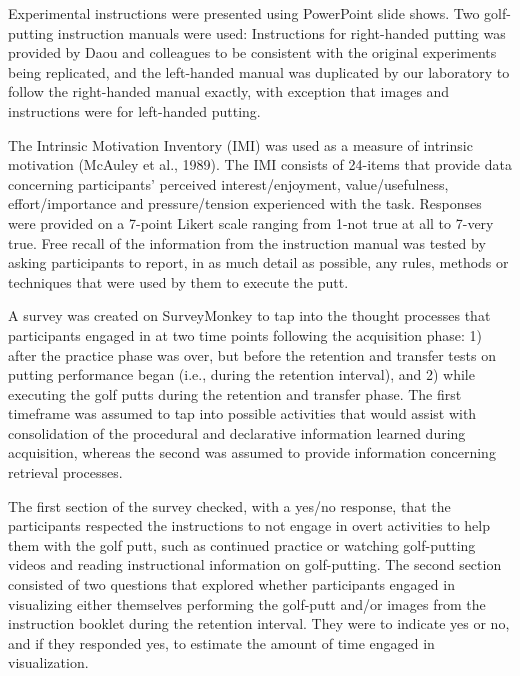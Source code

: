 \documentclass[
  english,
  man,floatsintext]{apa7}
\begin{document}
Experimental instructions were presented using PowerPoint slide shows. Two golf-putting instruction manuals were used: Instructions for right-handed putting was provided by Daou and colleagues to be consistent with the original experiments being replicated, and the left-handed manual was duplicated by our laboratory to follow the right-handed manual exactly, with exception that images and instructions were for left-handed putting.

The Intrinsic Motivation Inventory (IMI) was used as a measure of intrinsic motivation (McAuley et al., 1989). The IMI consists of 24-items that provide data concerning participants' perceived interest/enjoyment, value/usefulness, effort/importance and pressure/tension experienced with the task. Responses were provided on a 7-point Likert scale ranging from 1-not true at all to 7-very true. Free recall of the information from the instruction manual was tested by asking participants to report, in as much detail as possible, any rules, methods or techniques that were used by them to execute the putt.

A survey was created on SurveyMonkey to tap into the thought processes that participants engaged in at two time points following the acquisition phase: 1) after the practice phase was over, but before the retention and transfer tests on putting performance began (i.e., during the retention interval), and 2) while executing the golf putts during the retention and transfer phase. The first timeframe was assumed to tap into possible activities that would assist with consolidation of the procedural and declarative information learned during acquisition, whereas the second was assumed to provide information concerning retrieval processes.

The first section of the survey checked, with a yes/no response, that the participants respected the instructions to not engage in overt activities to help them with the golf putt, such as continued practice or watching golf-putting videos and reading instructional information on golf-putting. The second section consisted of two questions that explored whether participants engaged in visualizing either themselves performing the golf-putt and/or images from the instruction booklet during the retention interval. They were to indicate yes or no, and if they responded yes, to estimate the amount of time engaged in visualization.
\end{document}
